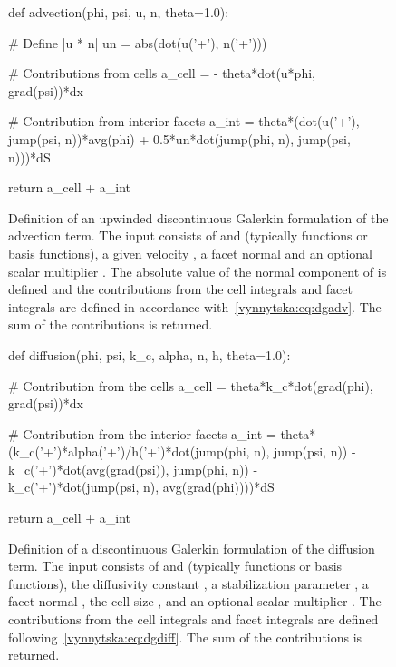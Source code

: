 \begin{figure}
  \begin{center}
    \begin{python}
def advection(phi, psi, u, n, theta=1.0):

    # Define |u * n|
    un = abs(dot(u('+'), n('+')))

    # Contributions from cells
    a_cell = - theta*dot(u*phi, grad(psi))*dx

    # Contribution from interior facets
    a_int = theta*(dot(u('+'), jump(psi, n))*avg(phi)
                   + 0.5*un*dot(jump(phi, n), jump(psi, n)))*dS

    return a_cell + a_int
    \end{python}
    \caption{Definition of an upwinded discontinuous Galerkin
      formulation of the advection term. The input consists of
       and  (typically functions or basis
      functions), a given velocity , a facet normal 
      and an optional scalar multiplier . The absolute
      value of the normal component of  is defined and the
      contributions from the cell integrals and facet integrals are
      defined in accordance with~\eqref{vynnytska:eq:dgadv}. The sum
      of the contributions is returned.}
    \label{vynnytska:fig:advection}
  \end{center}
\end{figure}
\begin{figure}
  \begin{center}
    \begin{python}
def diffusion(phi, psi, k_c, alpha, n, h, theta=1.0):

    # Contribution from the cells
    a_cell = theta*k_c*dot(grad(phi), grad(psi))*dx

    # Contribution from the interior facets
    a_int = theta*(k_c('+')*alpha('+')/h('+')*dot(jump(phi, n), jump(psi, n))
                   - k_c('+')*dot(avg(grad(psi)), jump(phi, n))
                   - k_c('+')*dot(jump(psi, n), avg(grad(phi))))*dS

    return a_cell + a_int
    \end{python}
    \caption{Definition of a discontinuous Galerkin formulation of the
      diffusion term. The input consists of  and 
      (typically functions or basis functions), the diffusivity
      constant , a stabilization parameter , a
      facet normal , the cell size , and an optional
      scalar multiplier . The contributions from the cell
      integrals and facet integrals are defined
      following~\eqref{vynnytska:eq:dgdiff}. The sum of the
      contributions is returned.}
    \label{vynnytska:fig:diffusion}
  \end{center}
\end{figure}


